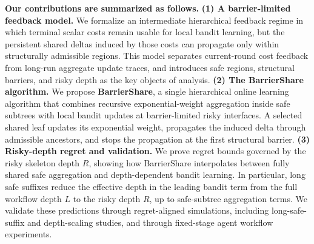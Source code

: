 \textbf{Our contributions are summarized as follows.}
\textbf{(1) A barrier-limited feedback model.}
We formalize an intermediate hierarchical feedback regime in which terminal scalar costs remain usable for local bandit learning, but the persistent shared deltas induced by those costs can propagate only within structurally admissible regions.
This model separates current-round cost feedback from long-run aggregate update traces, and introduces safe regions, structural barriers, and risky depth as the key objects of analysis.
\textbf{(2) The BarrierShare algorithm.}
We propose \textbf{BarrierShare}, a single hierarchical online learning algorithm that combines recursive exponential-weight aggregation inside safe subtrees with local bandit updates at barrier-limited risky interfaces.
A selected shared leaf updates its exponential weight, propagates the induced delta through admissible ancestors, and stops the propagation at the first structural barrier.
\textbf{(3) Risky-depth regret and validation.}
We prove regret bounds governed by the risky skeleton depth \(R\), showing how BarrierShare interpolates between fully shared safe aggregation and depth-dependent bandit learning.
In particular, long safe suffixes reduce the effective depth in the leading bandit term from the full workflow depth \(L\) to the risky depth \(R\), up to safe-subtree aggregation terms.
We validate these predictions through regret-aligned simulations, including long-safe-suffix and depth-scaling studies, and through fixed-stage agent workflow experiments.